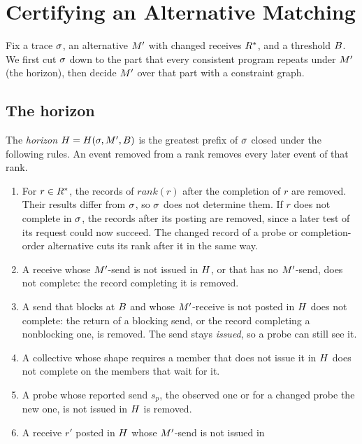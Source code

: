 \section{Certifying an Alternative Matching}
\label{sec:prediction}

Fix a trace $\sigma$, an alternative $M'$ with changed receives $R^{*}$, and a
threshold $B$. We first cut $\sigma$ down to the part that every consistent program
repeats under $M'$ (the horizon), then decide $M'$ over that part with a
constraint graph.

\subsection{The horizon}
\label{sec:horizon}

\begin{definition}[Horizon]
The \emph{horizon} $H=H(\sigma,M',B)$ is the greatest prefix of $\sigma$
closed under the following rules. An event removed from a rank removes every later
event of that rank.
\begin{enumerate}[leftmargin=*,label=(H\arabic*)]
\item\label{H:changed} For $r\in R^{*}$, the records of $\mathit{rank}(r)$ after the
  completion of $r$ are removed. Their results differ from $\sigma$, so $\sigma$ does not
  determine them. If $r$ does not complete in $\sigma$, the records after its posting are
  removed, since a later test of its request could now succeed. The changed record of a probe
  or completion-order alternative cuts its rank after it in the same way.
\item\label{H:recv} A receive whose $M'$-send is not issued in $H$, or that has no
  $M'$-send, does not complete: the record completing it is removed.
\item\label{H:send} A send that blocks at $B$ and whose $M'$-receive is not posted
  in $H$ does not complete: the return of a blocking send, or the record completing a
  nonblocking one, is removed. The send stays \emph{issued}, so a probe can still see it.
\item\label{H:coll} A collective whose shape requires a member that does not issue it in
  $H$ does not complete on the members that wait for it.
\item\label{H:probe} A probe whose reported send $s_p$, the observed one or for a changed probe
  the new one, is not issued in $H$ is removed.
\item\label{H:pending} A receive $r'$ posted in $H$ whose $M'$-send is not issued in

\end{enumerate}
\end{definition}
